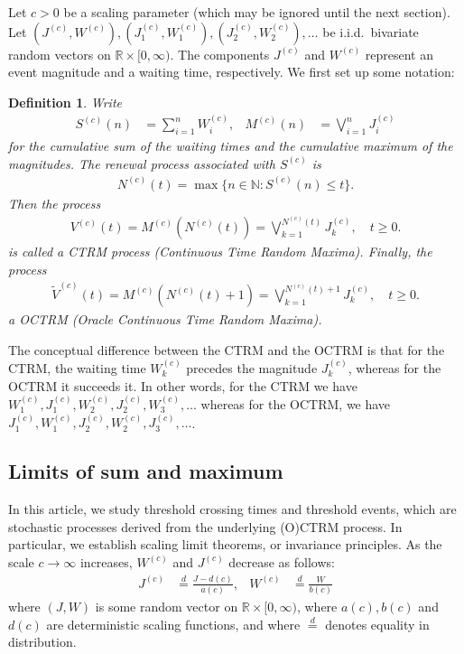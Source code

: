 \documentclass[12pt]{article}
\newtheorem{definition}[equation]{Definition}
\newcommand{\1}{\mathbf 1}
\begin{document}
Let $c > 0$ be a scaling parameter (which may be ignored until the next section). 
Let $(J^{(c)},W^{(c)}),(J^{(c)}_1,W^{(c)}_1),(J^{(c)}_2,W^{(c)}_2), \ldots$ 
be i.i.d.\ bivariate random vectors on $\mathbb R \times [0, \infty)$. 
The components $J^{(c)}$ and $W^{(c)}$ represent an event magnitude and 
a waiting time, respectively. 
We first set up some notation: 


\begin{definition}
Write 
\begin{align}
S^{(c)}(n) &= \sum_{i=1}^n W^{(c)}_i, 
&
M^{(c)}(n) &= \bigvee_{i=1}^n J^{(c)}_i
\end{align} 
for the cumulative sum of the waiting times and the cumulative maximum of the 
magnitudes. 
The renewal process associated with $S^{(c)}$ is 
\begin{align} \label{eq:renewal-process}
N^{(c)}(t) = \max\{n \in \mathbb N: S^{(c)}(n) \le t\}.
\end{align}
Then the process
\begin{align}
V^{(c)}(t) 
= M^{(c)}\left( N^{(c)}(t) \right) 
= \bigvee_{k=1}^{N^{(c)}(t)} J^{(c)}_k, \quad t \ge 0.
\end{align}
is called a CTRM process (Continuous Time Random Maxima). Finally, the process
\begin{align}
\tilde V^{(c)}(t) 
= M^{(c)}\left( N^{(c)}(t) + 1 \right) 
= \bigvee_{k=1}^{N^{(c)}(t) + 1} J^{(c)}_k, \quad t \ge 0.
\end{align}
a OCTRM (Oracle Continuous Time Random Maxima).
\end{definition}

The conceptual difference between the CTRM and the OCTRM is that for the CTRM, 
the waiting time $W^{(c)}_k$ precedes the magnitude $J^{(c)}_k$, whereas for 
the OCTRM it succeeds it. In other words, for the CTRM we have 
$W^{(c)}_1, J^{(c)}_1, W^{(c)}_2, J^{(c)}_2, W^{(c)}_3, \ldots$ whereas for the
OCTRM, we have $J^{(c)}_1, W^{(c)}_1, J^{(c)}_2, W^{(c)}_2, J^{(c)}_3, \ldots$. 


\subsection{Limits of sum and maximum}

In this article, we study threshold crossing times and threshold events, which 
are stochastic processes derived from the underlying (O)CTRM process. In
particular, we establish scaling limit theorems, or invariance principles. As 
the scale $c \to \infty$ increases, $W^{(c)}$ and $J^{(c)}$ decrease as follows: 
\begin{align}
J^{(c)} &\stackrel{d}{=} \frac{J - d(c)}{a(c)}, 
& 
W^{(c)} &\stackrel{d}{=} \frac{W}{b(c)}
\end{align}
where $(J,W)$ is some random vector on $\mathbb R \times [0,\infty)$, 
where $a(c), b(c)$ and $d(c)$ are deterministic scaling functions, 
and where $\stackrel{d}{=}$ denotes equality in distribution. 
\end{document}

